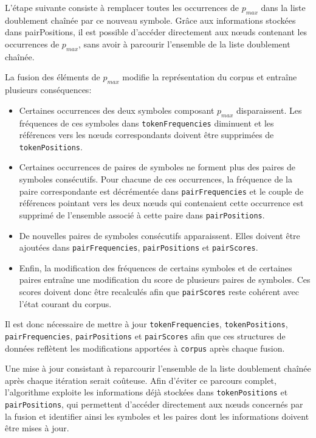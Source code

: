 \documentclass[12pt,a4paper]{report}
\begin{document}
\begin{enumerate}
	L'étape suivante consiste à remplacer toutes les occurrences de $p_{max}$ dans la liste doublement chaînée par ce nouveau symbole. Grâce aux informations stockées dans pairPositions, il est possible d'accéder directement aux nœuds contenant les occurrences de $p_{max}$, sans avoir à parcourir l'ensemble de la liste doublement chaînée.
	
	La fusion des éléments de $p_{max}$ modifie la représentation du corpus et entraîne plusieurs conséquences:
	
	\begin{itemize}
		\item Certaines occurrences des deux symboles composant $p_{max}$ disparaissent. Les fréquences de ces symboles dans \texttt{tokenFrequencies} diminuent et les références vers les nœuds correspondants doivent être supprimées de \texttt{tokenPositions}.
		
		\item Certaines occurrences de paires de symboles ne forment plus des paires de symboles consécutifs. Pour chacune de ces occurrences, la fréquence de la paire correspondante est décrémentée dans \texttt{pairFrequencies} et le couple de références pointant vers les deux nœuds qui contenaient cette occurrence est supprimé de l'ensemble associé à cette paire dans \texttt{pairPositions}.
		
		\item De nouvelles paires de symboles consécutifs apparaissent. Elles doivent être ajoutées dans \texttt{pairFrequencies}, \texttt{pairPositions} et \texttt{pairScores}.
		
		\item Enfin, la modification des fréquences de certains symboles et de certaines paires entraîne une modification du score de plusieurs paires de symboles. Ces scores doivent donc être recalculés afin que \texttt{pairScores} reste cohérent avec l'état courant du corpus.
	 \end{itemize}
	 
	 Il est donc nécessaire de mettre à jour \texttt{tokenFrequencies}, \texttt{tokenPositions}, \texttt{pairFrequencies}, \texttt{pairPositions} et \texttt{pairScores} afin que ces structures de données reflètent les modifications apportées à \texttt{corpus} après chaque fusion.
	 
	 Une mise à jour consistant à reparcourir l'ensemble de la liste doublement chaînée après chaque itération serait coûteuse. Afin d'éviter ce parcours complet, l'algorithme exploite les informations déjà stockées dans \texttt{tokenPositions} et \texttt{pairPositions}, qui permettent d'accéder directement aux nœuds concernés par la fusion et identifier ainsi les symboles et les paires dont les informations doivent être mises à jour.
	 

\end{enumerate}
\end{document}
